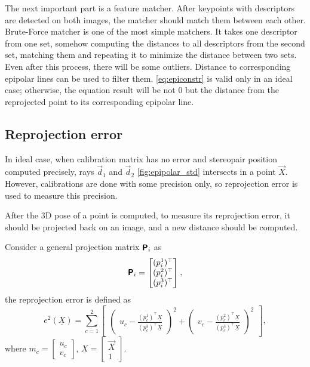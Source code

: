 The next important part is a feature matcher. 
After keypoints with descriptors are detected on both images, the matcher should match them between each other.
Brute-Force matcher is one of the most simple matchers.
It takes one descriptor from one set, somehow computing the distances to all descriptors from the second set, matching them and repeating it to minimize the distance between two sets.
Even after this process, there will be some outliers.
Distance to corresponding epipolar lines can be used to filter them. \autoref{eq:epiconstr} is valid only in an ideal case; otherwise, the equation result will be not $0$ but the distance from the reprojected point to its corresponding epipolar line.

\subsection{Reprojection error}
In ideal case, when calibration matrix has no error and stereopair position computed precisely, rays $\vec{d}_1$ and $\vec{d}_2$ \autoref{fig:epipolar_std} intersects in a point $\vec{X}$. 
However, calibrations are done with some precision only, so reprojection error is used to measure this precision.

After the 3D pose of a point is computed, to measure its reprojection error, it should be projected back on an image, and a new distance should be computed.

Consider a general projection matrix $\pmb{\mathsf{P}}_i$ as
\begin{equation}
    \label{eq:p_general}
    \pmb{\mathsf{P}}_i = \begin{bmatrix} (p_i^1)^\top \\ (p_i^2)^\top \\ (p_i^3)^\top \end{bmatrix},
\end{equation}
the reprojection error is defined as 
\begin{equation}
    e^2(\underline{X}) = \sum_{c=1}^{2}{  
    \begin{bmatrix}
        \begin{pmatrix}
            u_c - \frac{(p_c^1)^\top \underline{X}}{(p_c^3)^\top \underline{X}}
        \end{pmatrix}^2 + 
        \begin{pmatrix}
            v_c - \frac{(p_c^2)^\top \underline{X}}{(p_c^3)^\top \underline{X}}
        \end{pmatrix}^2
    \end{bmatrix}
    },
\end{equation}
where $m_c = \begin{bmatrix} u_c \\ v_c \end{bmatrix}$, $\underline{X} = \begin{bmatrix} \vec{X} \\ 1 \end{bmatrix}$.

